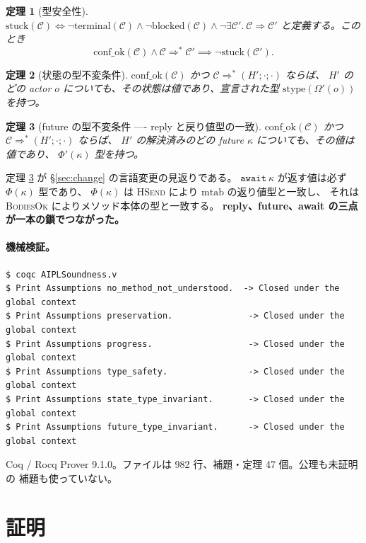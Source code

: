 \documentclass[11pt,a4paper]{ltjsarticle}
\newtheorem{theorem}{定理}
\theoremstyle{definition}
\theoremstyle{remark}
\newcommand{\Om}{\Omega}          %
\newcommand{\Ph}{\Phi}            %
\newcommand{\mtab}{\mathrm{mtab}}
\newcommand{\stype}{\mathrm{stype}}
\newcommand{\cstep}{\Longrightarrow}
\newcommand{\confok}{\mathrm{conf\_ok}}
\newcommand{\stuck}{\mathrm{stuck}}
\begin{document}
\begin{theorem}[型安全性]
\label{thm:safety}
$\stuck(\mathcal{C}) \iff
\lnot\mathrm{terminal}(\mathcal{C}) \land \lnot\mathrm{blocked}(\mathcal{C})
\land \lnot\exists \mathcal{C}'.\ \mathcal{C} \cstep \mathcal{C}'$
と定義する。このとき
\[
\confok(\mathcal{C}) \land \mathcal{C} \cstep^{*} \mathcal{C}'
\implies \lnot\stuck(\mathcal{C}').
\]
\end{theorem}

\begin{theorem}[状態の型不変条件]
\label{thm:stinv}
$\confok(\mathcal{C})$ かつ $\mathcal{C} \cstep^{*} (H';\cdot;\cdot)$ ならば、
$H'$ のどの actor $o$ についても、その状態は値であり、宣言された型
$\stype(\Om'(o))$ を持つ。
\end{theorem}

\begin{theorem}[future の型不変条件 ---- reply と戻り値型の一致]
\label{thm:futinv}
$\confok(\mathcal{C})$ かつ $\mathcal{C} \cstep^{*} (H';\cdot;\cdot)$ ならば、
$H'$ の解決済みのどの future $\kappa$ についても、その値は値であり、
$\Ph'(\kappa)$ 型を持つ。
\end{theorem}

定理 \ref{thm:futinv} が \S\ref{sec:change} の言語変更の見返りである。
$\mathtt{await}\ \kappa$ が返す値は必ず $\Ph(\kappa)$ 型であり、
$\Ph(\kappa)$ は \textsc{HSend} により $\mtab$ の返り値型と一致し、
それは \textsc{BodiesOk} によりメソッド本体の型と一致する。
\textbf{reply、future、await の三点が一本の鎖でつながった。}

\paragraph{機械検証。}
\begin{lstlisting}[language={}]
$ coqc AIPLSoundness.v
$ Print Assumptions no_method_not_understood.  -> Closed under the global context
$ Print Assumptions preservation.               -> Closed under the global context
$ Print Assumptions progress.                   -> Closed under the global context
$ Print Assumptions type_safety.                -> Closed under the global context
$ Print Assumptions state_type_invariant.       -> Closed under the global context
$ Print Assumptions future_type_invariant.      -> Closed under the global context
\end{lstlisting}
Coq / Rocq Prover 9.1.0。ファイルは 982 行、補題・定理 47 個。公理も未証明の
補題も使っていない。

\section{証明}
\end{document}
